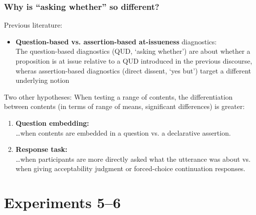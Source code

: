 \documentclass[compress, xcolor = dvipsnames, aspectratio=169, handout]{beamer}
\begin{document}
	\begin{frame}[t]\frametitle{Why is \enquote{asking whether} so different?}\small 
		Previous literature:
		\begin{itemize}
			\item \textbf{Question-based vs. assertion-based at-issueness} diagnostics:\\
				The question-based diagnostics (QUD, `asking whether') are about whether a proposition is at issue relative to a QUD introduced in the previous discourse, wheras assertion-based diagnostics (direct dissent, `yes but') target a different underlying notion

		\end{itemize}\pause
		\vfill 

		Two other hypotheses: When testing a range of contents, the differentiation between contents (in terms of range of means, significant differences) is greater:
		\begin{enumerate}
			\item \textbf{Question embedding:} \\ 
				\dots when contents are embedded in a question vs. a declarative assertion.\pause
				
			\item \textbf{Response task:} \\ \dots when participants are more directly asked what the utterance was about vs. when giving acceptability judgment or forced-choice continuation responses.
			
		\end{enumerate}

	\end{frame}

\section{Experiments 5–6}
\end{document}
